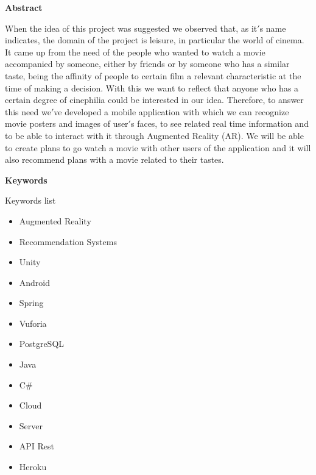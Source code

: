 
\newpage

\thispagestyle{empty}

\begin{center}

{\bf \Huge Abstract}

  \end{center}
\vspace{1cm}
\begin{flushleft}
When the idea of this project was suggested we observed that, as it$'$s name indicates, the
domain of the project is leisure, in particular the world of cinema. It came up from the need of 
the people who wanted to watch a movie accompanied by someone, either by friends or by someone who has
a similar taste, being the affinity of people to certain film a relevant characteristic at the time of making
a decision. With this we want to reflect that anyone who has a certain degree of cinephilia could be interested
in our idea. Therefore, to answer this need we$'$ve developed a mobile application with which we can recognize movie
posters and images of user$'$s faces, to see related real time information and to be able to interact with it through 
Augmented Reality (AR). We will be able to create plans to go watch a movie with other users of the application and it 
will also recommend plans with a movie related to their tastes.
\end{flushleft}
\vspace{1cm}

\begin{center}

  {\bf \Large Keywords}
  
     \end{center}
  
     \vspace{0.5cm}
     
     Keywords list
     \begin{itemize}  
      \item Augmented Reality
      \item Recommendation Systems
      \item Unity
      \item Android
      \item Spring
      \item Vuforia
      \item PostgreSQL
      \item Java
      \item C\#
      \item Cloud
      \item Server
      \item API Rest
      \item Heroku
    \end{itemize}
   


